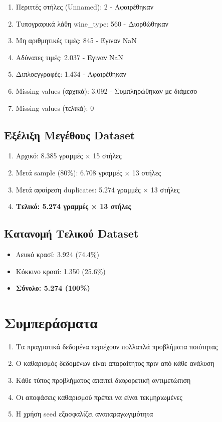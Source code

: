 \documentclass[12pt,a4paper]{article}
\begin{document}
\begin{enumerate}
    \item Περιττές στήλες (Unnamed): 2 - Αφαιρέθηκαν
    \item Τυπογραφικά λάθη wine\_type: 560 - Διορθώθηκαν
    \item Μη αριθμητικές τιμές: 845 - Έγιναν NaN
    \item Αδύνατες τιμές: 2.037 - Έγιναν NaN
    \item Διπλοεγγραφές: 1.434 - Αφαιρέθηκαν
    \item Missing values (αρχικά): 3.092 - Συμπληρώθηκαν με διάμεσο
    \item Missing values (τελικά): 0
\end{enumerate}

\subsection{Εξέλιξη Μεγέθους Dataset}

\begin{enumerate}
    \item Αρχικό: 8.385 γραμμές × 15 στήλες
    \item Μετά sample (80\%): 6.708 γραμμές × 13 στήλες
    \item Μετά αφαίρεση duplicates: 5.274 γραμμές × 13 στήλες
    \item \textbf{Τελικό: 5.274 γραμμές × 13 στήλες}
\end{enumerate}

\subsection{Κατανομή Τελικού Dataset}

\begin{itemize}
    \item Λευκό κρασί: 3.924 (74.4\%)
    \item Κόκκινο κρασί: 1.350 (25.6\%)
    \item \textbf{Σύνολο: 5.274 (100\%)}
\end{itemize}

\section{Συμπεράσματα}

\begin{enumerate}
    \item Τα πραγματικά δεδομένα περιέχουν πολλαπλά προβλήματα ποιότητας
    \item Ο καθαρισμός δεδομένων είναι απαραίτητος πριν από κάθε ανάλυση
    \item Κάθε τύπος προβλήματος απαιτεί διαφορετική αντιμετώπιση
    \item Οι αποφάσεις καθαρισμού πρέπει να είναι τεκμηριωμένες
    \item Η χρήση seed εξασφαλίζει αναπαραγωγιμότητα
\end{enumerate}
\end{document}
